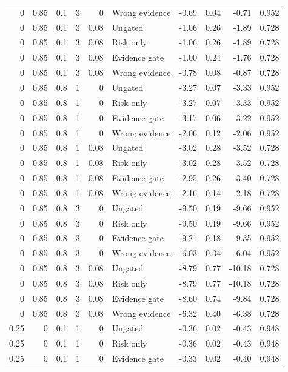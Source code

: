 \begin{longtable}{rrrrrlrrrr}
0 & 0.85 & 0.1 & 3 & 0 & Wrong evidence & -0.69 & 0.04 & -0.71 & 0.952\\
0 & 0.85 & 0.1 & 3 & 0.08 & Ungated & -1.06 & 0.26 & -1.89 & 0.728\\
0 & 0.85 & 0.1 & 3 & 0.08 & Risk only & -1.06 & 0.26 & -1.89 & 0.728\\
0 & 0.85 & 0.1 & 3 & 0.08 & Evidence gate & -1.00 & 0.24 & -1.76 & 0.728\\
0 & 0.85 & 0.1 & 3 & 0.08 & Wrong evidence & -0.78 & 0.08 & -0.87 & 0.728\\
0 & 0.85 & 0.8 & 1 & 0 & Ungated & -3.27 & 0.07 & -3.33 & 0.952\\
0 & 0.85 & 0.8 & 1 & 0 & Risk only & -3.27 & 0.07 & -3.33 & 0.952\\
0 & 0.85 & 0.8 & 1 & 0 & Evidence gate & -3.17 & 0.06 & -3.22 & 0.952\\
0 & 0.85 & 0.8 & 1 & 0 & Wrong evidence & -2.06 & 0.12 & -2.06 & 0.952\\
0 & 0.85 & 0.8 & 1 & 0.08 & Ungated & -3.02 & 0.28 & -3.52 & 0.728\\
0 & 0.85 & 0.8 & 1 & 0.08 & Risk only & -3.02 & 0.28 & -3.52 & 0.728\\
0 & 0.85 & 0.8 & 1 & 0.08 & Evidence gate & -2.95 & 0.26 & -3.40 & 0.728\\
0 & 0.85 & 0.8 & 1 & 0.08 & Wrong evidence & -2.16 & 0.14 & -2.18 & 0.728\\
0 & 0.85 & 0.8 & 3 & 0 & Ungated & -9.50 & 0.19 & -9.66 & 0.952\\
0 & 0.85 & 0.8 & 3 & 0 & Risk only & -9.50 & 0.19 & -9.66 & 0.952\\
0 & 0.85 & 0.8 & 3 & 0 & Evidence gate & -9.21 & 0.18 & -9.35 & 0.952\\
0 & 0.85 & 0.8 & 3 & 0 & Wrong evidence & -6.03 & 0.34 & -6.04 & 0.952\\
0 & 0.85 & 0.8 & 3 & 0.08 & Ungated & -8.79 & 0.77 & -10.18 & 0.728\\
0 & 0.85 & 0.8 & 3 & 0.08 & Risk only & -8.79 & 0.77 & -10.18 & 0.728\\
0 & 0.85 & 0.8 & 3 & 0.08 & Evidence gate & -8.60 & 0.74 & -9.84 & 0.728\\
0 & 0.85 & 0.8 & 3 & 0.08 & Wrong evidence & -6.32 & 0.40 & -6.38 & 0.728\\
0.25 & 0 & 0.1 & 1 & 0 & Ungated & -0.36 & 0.02 & -0.43 & 0.948\\
0.25 & 0 & 0.1 & 1 & 0 & Risk only & -0.36 & 0.02 & -0.43 & 0.948\\
0.25 & 0 & 0.1 & 1 & 0 & Evidence gate & -0.33 & 0.02 & -0.40 & 0.948\\

\end{longtable}
